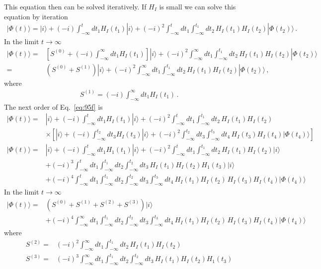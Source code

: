 This equation then can  be solved iteratively. If $H_I$ is small we can solve this equation by iteration
\begin{align}
\label{eq:95f}
  |\Phi(t)\rangle=|i\rangle+(-i)\int_{-\infty}^t d t_1 H_I(t_1)|i\rangle+(-i)^2\int_{-\infty}^t d t_1\int_{-\infty}^{t_1} d t_2\,H_I(t_1)H_I(t_2)|\Phi(t_2)\rangle\,.
\end{align}
In the limit $t\to\infty$
\begin{align}
  |\Phi(t)\rangle=&\left[S^{(0)}+(-i)\int_{-\infty}^\infty d t_1 H_I(t_1)\right]|i\rangle+(-i)^2\int_{-\infty}^\infty d t_1\int_{-\infty}^{t_1} d t_2\,H_I(t_1)H_I(t_2)|\Phi(t_2)\rangle\nonumber\\
  =&\left(S^{(0)}+S^{(1)}\right)|i\rangle+(-i)^2\int_{-\infty}^\infty d t_1\int_{-\infty}^{t_1} d t_2\,H_I(t_1)H_I(t_2)|\Phi(t_2)\rangle\,,
\end{align}
where 
\begin{align}
  \label{eq:S1}
  S^{(1)}=(-i)\int_{-\infty}^\infty d t_1 H_I(t_1)\,.
\end{align}
The next order of Eq.~\eqref{eq:95f} is
\begin{align}
  |\Phi(t)\rangle=&|i\rangle+(-i)\int_{-\infty}^t d t_1 H_I(t_1)|i\rangle+(-i)^2\int_{-\infty}^t d t_1\int_{-\infty}^{t_1} d t_2\,H_I(t_1)H_I(t_2)\nonumber\\
  &\times\left[|i\rangle+(-i)\int_{-\infty}^{t_2} d t_3 H_I(t_3)|i\rangle+(-i)^2\int_{-\infty}^{t_2} d t_3\int_{-\infty}^{t_3} d t_4\,H_I(t_3)H_I(t_4)|\Phi(t_4)\rangle\right]
\end{align}
\begin{align}
  |\Phi(t)\rangle=&|i\rangle+(-i)\int_{-\infty}^t d t_1 H_1(t_1)|i\rangle+(-i)^2\int_{-\infty}^t d t_1\int_{-\infty}^{t_1} d t_2\,H_I(t_1)H_I(t_2)|i\rangle\nonumber\\
  &+(-i)^3\int_{-\infty}^t d t_1\int_{-\infty}^{t_1} d t_2\int_{-\infty}^{t_2} d t_3\,H_I(t_1)H_I(t_2) H_1(t_3)|i\rangle\nonumber\\
  &+(-i)^4\int_{-\infty}^t d t_1\int_{-\infty}^{t_1}d t_2 \int_{-\infty}^{t_2} d t_3\int_{-\infty}^{t_3}d t_4 \,H_I(t_1)H_I(t_2)\,H_I(t_3)H_I(t_4)|\Phi(t_4)\rangle
\end{align}
In the limit $t\to\infty$
\begin{align}
  |\Phi(t)\rangle=&\left(S^{(0)}+S^{(1)}+S^{(2)}+S^{(3)}\right)|i\rangle\nonumber\\
  &+(-i)^4\int_{-\infty}^\infty d t_1\int_{-\infty}^{t_1}d t_2 \int_{-\infty}^{t_2} d t_3\int_{-\infty}^{t_3}d t_4 \,H_I(t_1)H_I(t_2)\,H_I(t_3)H_I(t_4)|\Phi(t_4)\rangle
\end{align}
where
\begin{align}
  S^{(2)}=&(-i)^2\int_{-\infty}^\infty d t_1\int_{-\infty}^{t_1} d t_2\,H_I(t_1)H_I(t_2)\nonumber\\
  S^{(3)}=&(-i)^3\int_{-\infty}^\infty d t_1\int_{-\infty}^{t_1} d t_2\int_{-\infty}^{t_2} d t_3\,H_I(t_1)H_I(t_2) H_1(t_3)
\end{align}


